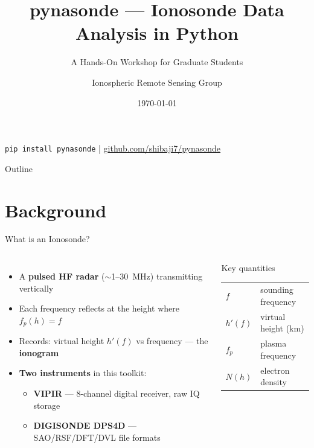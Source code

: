 \documentclass[aspectratio=169,11pt]{beamer}
\title[pynasonde Workshop]{%
  \textbf{pynasonde} — Ionosonde Data Analysis in Python}
\subtitle{A Hands-On Workshop for Graduate Students}
\author{Ionospheric Remote Sensing Group}
\institute{VIPIR \& DIGISONDE Analysis Toolkit}
\date{\today}
\begin{document}

\begin{frame}
  \titlepage
  \vspace{-0.5cm}
  \begin{center}
    \small
    \texttt{pip install pynasonde} \quad|\quad
    \href{https://github.com/shibaji7/pynasonde}{github.com/shibaji7/pynasonde}
  \end{center}
\end{frame}

\begin{frame}{Outline}
  \tableofcontents
\end{frame}

\section{Background}

\begin{frame}{What is an Ionosonde?}
\begin{columns}
  \begin{itemize}
    \item A \textbf{pulsed HF radar} ($\sim$1–30~MHz) transmitting vertically
    \item Each frequency reflects at the height where $f_p(h) = f$
    \item Records: virtual height $h'(f)$ vs frequency — the \textbf{ionogram}
    \item \textbf{Two instruments} in this toolkit:
      \begin{itemize}
        \item \textbf{VIPIR} — 8-channel digital receiver, raw IQ storage
        \item \textbf{DIGISONDE DPS4D} — SAO/RSF/DFT/DVL file formats
      \end{itemize}
  \end{itemize}
  \begin{block}{Key quantities}
    \begin{tabular}{ll}
      $f$     & sounding frequency \\
      $h'(f)$ & virtual height (km)\\
      $f_p$   & plasma frequency \\
      $N(h)$  & electron density \\
    \end{tabular}
  \end{block}
\end{columns}
\end{frame}
\end{document}
